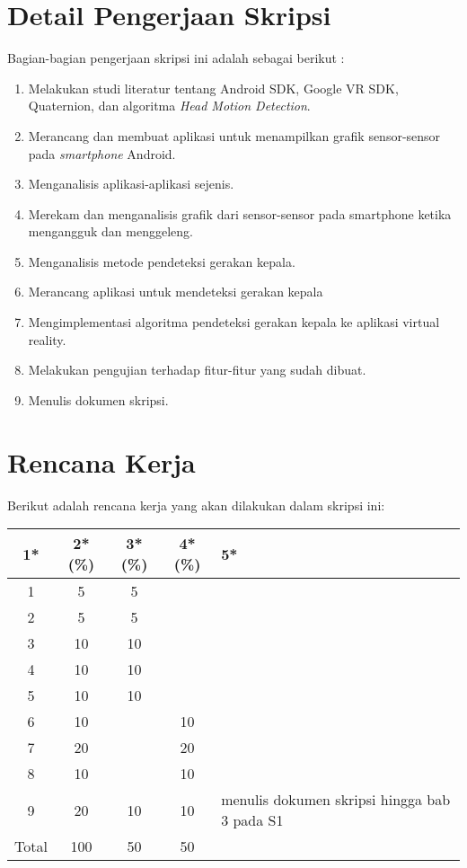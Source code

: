 \documentclass[a4paper,twoside]{article}
\begin{document}
\section{Detail Pengerjaan Skripsi}

Bagian-bagian pengerjaan skripsi ini adalah sebagai berikut :
	\begin{enumerate}
		\item Melakukan studi literatur tentang Android SDK, Google VR SDK, Quaternion, dan algoritma \textit{Head Motion Detection}.
		\item Merancang dan membuat aplikasi untuk menampilkan grafik sensor-sensor pada \textit{smartphone} Android.
		\item Menganalisis aplikasi-aplikasi sejenis.
		\item Merekam dan menganalisis grafik dari sensor-sensor pada smartphone ketika mengangguk dan menggeleng.
		\item Menganalisis metode pendeteksi gerakan kepala.
		\item Merancang aplikasi untuk mendeteksi gerakan kepala
		\item Mengimplementasi algoritma pendeteksi gerakan kepala ke aplikasi virtual reality.
		\item Melakukan pengujian terhadap fitur-fitur yang sudah dibuat.
		\item Menulis dokumen skripsi.

	\end{enumerate}
\section{Rencana Kerja}
Berikut adalah rencana kerja yang akan dilakukan dalam skripsi ini:
\begin{center}
  \begin{tabular}{ | c | c | c | c | l |}
    \hline
    1*  & 2*(\%) & 3*(\%) & 4*(\%) &5*\\ \hline \hline
    1   & 5  & 5  &  &  \\ \hline
    2   & 5 & 5  &   & \\ \hline
    3   & 10  & 10  &  & \\ \hline
    4   & 10  & 10  &  & \\ \hline
    5   & 10  & 10  &  & \\ \hline
    6   & 10 &   & 10  & \\ \hline
    7   & 20  &   & 20 & \\ \hline
    8   & 10  &   &  10  & \\ \hline
    9   & 20  & 10  & 10  & {\footnotesize menulis dokumen skripsi hingga bab 3 pada S1}\\ \hline
    Total  & 100  & 50  & 50 &  \\ \hline
                          \end{tabular}
\end{center}
\end{document}
